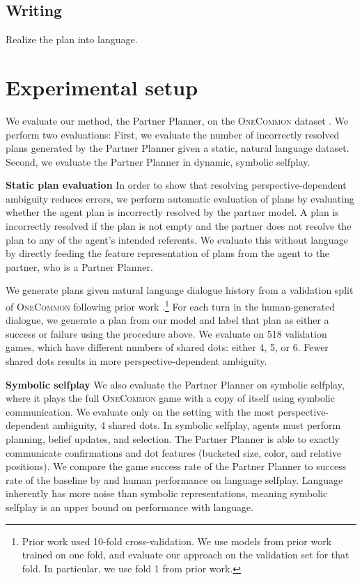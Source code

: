\documentclass[11pt]{article}
\begin{document}
\subsection{Writing}
Realize the plan into language.

\section{Experimental setup}
\label{sec:exp}
We evaluate our method, the Partner Planner, on the \textsc{OneCommon} dataset \citep{onecommon}.
We perform two evaluations:
First, we evaluate the number of incorrectly resolved plans generated by the Partner Planner given a static, natural language dataset.
Second, we evaluate the Partner Planner in dynamic, symbolic selfplay.


\textbf{Static plan evaluation}
In order to show that resolving perspective-dependent
ambiguity reduces errors,
we perform automatic evaluation of plans by evaluating whether the agent plan is incorrectly resolved by the partner model.
A plan is incorrectly resolved if the plan is not empty and the partner does not resolve the plan to any
of the agent's intended referents.
We evaluate this without language by directly feeding the feature
representation of plans from the agent to the partner, who is a Partner Planner.

We generate plans given natural language dialogue history from a validation split of \textsc{OneCommon} following prior work \citep{fried}.\footnote{
Prior work used 10-fold cross-validation.
We use models from prior work trained on one fold, and evaluate our approach
on the validation set for that fold.
In particular, we use fold 1 from prior work.
}
For each turn in the human-generated dialogue, we generate a plan from our model
and label that plan as either a success or failure using the procedure above.
We evaluate on 518 validation games, which have different numbers of shared dots: either 4, 5, or 6.
Fewer shared dots results in more perspective-dependent ambiguity.

\textbf{Symbolic selfplay}
We also evaluate the Partner Planner on symbolic selfplay,
where it plays the full \textsc{OneCommon} game with a copy of itself using symbolic communication.
We evaluate only on the setting with the most perspective-dependent ambiguity, 4 shared dots.
In symbolic selfplay, agents must perform planning, belief updates, and selection.
The Partner Planner is able to exactly communicate confirmations and dot features (bucketed size, color, and relative positions).
We compare the game success rate of the Partner Planner to success rate of the baseline by \cite{fried} and human performance on language selfplay.
Language inherently has more noise than symbolic representations,
meaning symbolic selfplay is an upper bound on performance with language.
\end{document}
